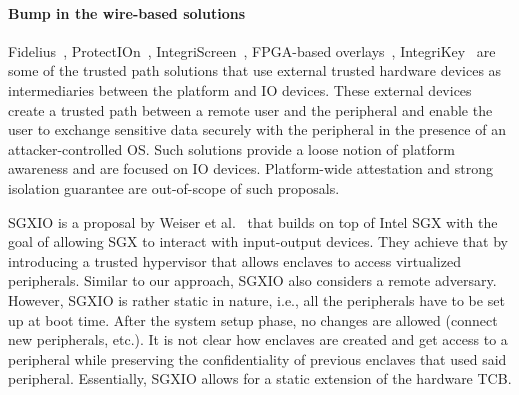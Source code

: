 \paragraph{Bump in the wire-based solutions} Fidelius~\cite{Fidelius}, ProtectIOn~\cite{protection}, IntegriScreen~\cite{integriscreen}, FPGA-based overlays~\cite{fpga_overlay}, IntegriKey~\cite{integrikey} are some of the trusted path solutions that use external trusted hardware devices as intermediaries between the platform and IO devices. These external devices create a trusted path between a remote user and the peripheral and enable the user to exchange sensitive data securely with the peripheral in the presence of an attacker-controlled OS. Such solutions provide a loose notion of platform awareness and are focused on IO devices. Platform-wide attestation and strong isolation guarantee are out-of-scope of such proposals. 

\setcounter{para}{0}


%     

\iffalse
\setcounter{para}{0}
 SGXIO is a proposal by Weiser et al.~\cite{weiser2017sgxio} that builds on top of Intel SGX with the goal of allowing SGX to interact with input-output devices. They achieve that by introducing a trusted hypervisor that allows enclaves to access virtualized peripherals. Similar to our approach, SGXIO also considers a remote adversary. However, SGXIO is rather static in nature, i.e., all the peripherals have to be set up at boot time. After the system setup phase, no changes are allowed (connect new peripherals, etc.). It is not clear how enclaves are created and get access to a peripheral while preserving the confidentiality of previous enclaves that used said peripheral. Essentially, SGXIO allows for a static extension of the hardware TCB.

